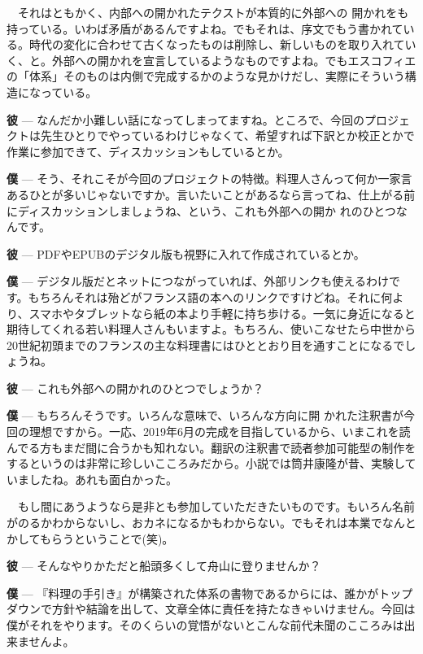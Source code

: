 \documentclass[14Q,]{ltjsbook}
\renewcommand{\kenten}[1]{#1}
\begin{document}
　それはともかく、内部への\kenten{開かれ}たテクストが本質的に外部への
\kenten{開かれ}をも持っている。いわば矛盾があるんですよね。でもそれは、序文でもう書かれている。時代の変化に合わせて古くなったものは削除し、新しいものを取り入れていく、と。外部への\kenten{開かれ}を宣言しているようなものですよね。でもエスコフィエの「体系」そのものは内側で完成するかのような見かけだし、実際にそういう構造になっている。

\textbf{彼} ---
なんだか小難しい話になってしまってますね。ところで、今回のプロジェクトは先生ひとりでやっているわけじゃなくて、希望すれば下訳とか校正とかで作業に参加できて、ディスカッションもしているとか。

\textbf{僕} ---
そう、それこそが今回のプロジェクトの特徴。料理人さんって何か一家言あるひとが多いじゃないですか。言いたいことがあるなら言ってね、仕上がる前にディスカッションしましょうね、という、これも外部への\kenten{開か
れ}のひとつなんです。

\textbf{彼} --- PDFやEPUBのデジタル版も視野に入れて作成されているとか。

\textbf{僕} ---
デジタル版だとネットにつながっていれば、外部リンクも使えるわけです。もちろんそれは殆どがフランス語の本へのリンクですけどね。それに何より、スマホやタブレットなら紙の本より手軽に持ち歩ける。一気に身近になると期待してくれる若い料理人さんもいますよ。もちろん、使いこなせたら中世から20世紀初頭までのフランスの主な料理書にはひととおり目を通すことになるでしょうね。

\textbf{彼} --- これも外部への\kenten{開かれ}のひとつでしょうか？

\textbf{僕} ---
もちろんそうです。いろんな意味で、いろんな方向に\kenten{開
かれた注釈書}が今回の理想ですから。一応、2019年6月の完成を目指しているから、いまこれを読んでる方もまだ間に合うかも知れない。翻訳の注釈書で読者参加可能型の制作をするというのは非常に珍しいこころみだから。小説では筒井康隆が昔、実験していましたね。あれも面白かった。

　もし間にあうようなら是非とも参加していただきたいものです。もいろん名前がのるかわからないし、おカネになるかもわからない。でもそれは本業でなんとかしてもらうということで(笑)。

\textbf{彼} --- そんなやりかただと船頭多くして舟山に登りませんか？

\textbf{僕} ---
『料理の手引き』が構築された\kenten{体系}の書物であるからには、誰かがトップダウンで方針や結論を出して、文章全体に責任を持たなきゃいけません。今回は僕がそれをやります。そのくらいの覚悟がないとこんな前代未聞のこころみは出来ませんよ。
\end{document}
